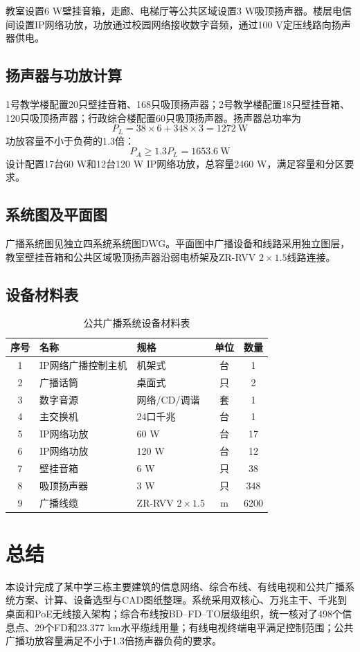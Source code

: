 \documentclass[UTF8,zihao=-4,openany]{ctexrep}
\begin{document}
教室设置6 W壁挂音箱，走廊、电梯厅等公共区域设置3 W吸顶扬声器。楼层电信间设置IP网络功放，功放通过校园网络接收数字音频，通过100 V定压线路向扬声器供电。

\section{扬声器与功放计算}
1号教学楼配置20只壁挂音箱、168只吸顶扬声器；2号教学楼配置18只壁挂音箱、120只吸顶扬声器；行政综合楼配置60只吸顶扬声器。扬声器总功率为
\begin{equation}
P_L=38\times6+348\times3=1272\ \mathrm{W}
\end{equation}
功放容量不小于负荷的1.3倍：
\begin{equation}
P_A\geq1.3P_L=1653.6\ \mathrm{W}
\end{equation}
设计配置17台60 W和12台120 W IP网络功放，总容量2460 W，满足容量和分区要求。

\section{系统图及平面图}
广播系统图见独立四系统系统图DWG。平面图中广播设备和线路采用独立图层，教室壁挂音箱和公共区域吸顶扬声器沿弱电桥架及ZR-RVV $2\times1.5$线路连接。

\section{设备材料表}
\begin{table}[H]
\centering
\caption{公共广播系统设备材料表}
\begin{tabular}{cllcc}
\toprule
序号&名称&规格&单位&数量\\
\midrule
1&IP网络广播控制主机&机架式&台&1\\
2&广播话筒&桌面式&只&2\\
3&数字音源&网络/CD/调谐&套&1\\
4&主交换机&24口千兆&台&1\\
5&IP网络功放&60 W&台&17\\
6&IP网络功放&120 W&台&12\\
7&壁挂音箱&6 W&只&38\\
8&吸顶扬声器&3 W&只&348\\
9&广播线缆&ZR-RVV $2\times1.5$&m&6200\\
\bottomrule
\end{tabular}
\end{table}

\chapter{总结}
本设计完成了某中学三栋主要建筑的信息网络、综合布线、有线电视和公共广播系统方案、计算、设备选型与CAD图纸整理。系统采用双核心、万兆主干、千兆到桌面和PoE无线接入架构；综合布线按BD--FD--TO层级组织，统一核对了498个信息点、29个FD和23.377 km水平缆线用量；有线电视终端电平满足控制范围；公共广播功放容量满足不小于1.3倍扬声器负荷的要求。
\end{document}
